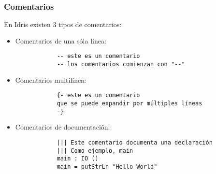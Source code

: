 \documentclass{beamer}
\begin{document}
\begin{frame}[fragile]
  \frametitle{Comentarios}

  En Idris existen 3 tipos de comentarios:
  \begin{itemize}
    \item Comentarios de una sóla línea:
      \vspace{5pt}
      \begin{center}
        \begin{minipage}{0.6\textwidth}
          \begin{verbatim}
            -- este es un comentario
            -- los comentarios comienzan con "--"
          \end{verbatim}
        \end{minipage}
      \end{center}
      \vspace{5pt}

    \item Comentarios multilínea:
      \vspace{5pt}
      \begin{center}
        \begin{minipage}{0.6\textwidth}
          \begin{verbatim}
            {- este es un comentario
            que se puede expandir por múltiples líneas
            -}
          \end{verbatim}
        \end{minipage}
      \end{center}
      \vspace{5pt}

    \item Comentarios de documentación:
      \vspace{5pt}
      \begin{center}
        \begin{minipage}{0.6\textwidth}
          \begin{verbatim}
            ||| Este comentario documenta una declaración
            ||| Como ejemplo, main
            main : IO ()
            main = putStrLn "Hello World"
          \end{verbatim}
        \end{minipage}
      \end{center}
      \vspace{5pt}

  \end{itemize}

\end{frame}
\end{document}
